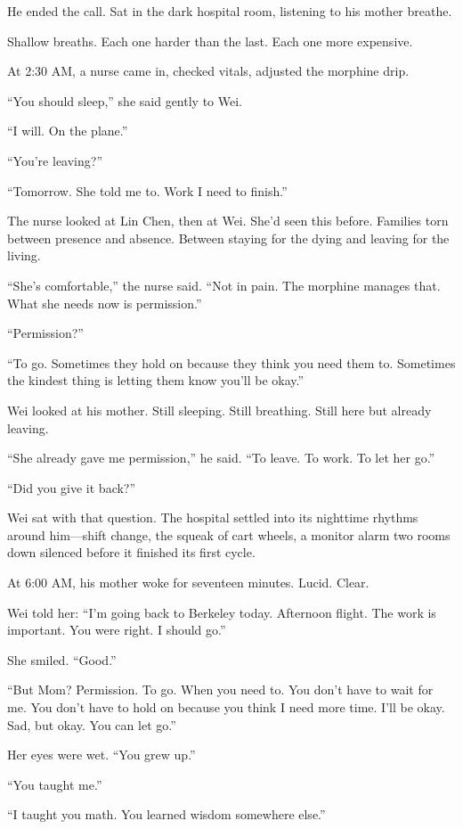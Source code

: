 He ended the call. Sat in the dark hospital room, listening to his mother breathe.

Shallow breaths. Each one harder than the last. Each one more expensive.

At 2:30 AM, a nurse came in, checked vitals, adjusted the morphine drip.

``You should sleep,'' she said gently to Wei.

``I will. On the plane.''

``You're leaving?''

``Tomorrow. She told me to. Work I need to finish.''

The nurse looked at Lin Chen, then at Wei. She'd seen this before. Families torn between presence and absence. Between staying for the dying and leaving for the living.

``She's comfortable,'' the nurse said. ``Not in pain. The morphine manages that. What she needs now is permission.''

``Permission?''

``To go. Sometimes they hold on because they think you need them to. Sometimes the kindest thing is letting them know you'll be okay.''

Wei looked at his mother. Still sleeping. Still breathing. Still here but already leaving.

``She already gave me permission,'' he said. ``To leave. To work. To let her go.''

``Did you give it back?''

Wei sat with that question. The hospital settled into its nighttime rhythms around him---shift change, the squeak of cart wheels, a monitor alarm two rooms down silenced before it finished its first cycle.

At 6:00 AM, his mother woke for seventeen minutes. Lucid. Clear.

Wei told her: ``I'm going back to Berkeley today. Afternoon flight. The work is important. You were right. I should go.''

She smiled. ``Good.''

``But Mom? Permission. To go. When you need to. You don't have to wait for me. You don't have to hold on because you think I need more time. I'll be okay. Sad, but okay. You can let go.''

Her eyes were wet. ``You grew up.''

``You taught me.''

``I taught you math. You learned wisdom somewhere else.''

